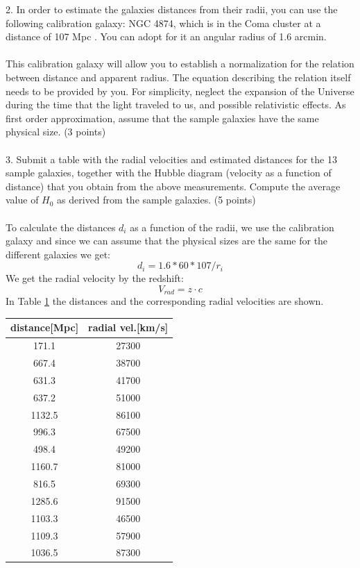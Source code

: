 \documentclass[11pt,a4paper,twoside]{article}
\begin{document}
2. In order to estimate the galaxies distances from their radii, you can use the following
calibration galaxy: NGC 4874, which is in the Coma cluster at a distance of 107 Mpc . You
can adopt for it an angular radius of 1.6 arcmin.\\
\\
This calibration galaxy will allow you to establish a normalization for the relation between
distance and apparent radius.
The equation describing the relation itself needs to be provided
by you. For simplicity, neglect the
expansion of the Universe during the time that the light
traveled to us, and possible relativistic effects. As first order approximation, assume that the
sample galaxies have the same physical size. (3 points)\\
\\
3. Submit a table with the radial velocities and estimated distances for the 13 sample
galaxies, together with the Hubble diagram (velocity as a function of distance) that you obtain
from the above measurements.
Compute the average value of $H_0$ as derived from the sample galaxies. (5 points)\\
\\
To calculate the distances $d_i$ as a function of the radii, we use the calibration galaxy and since we can assume that the physical sizes are the same for the different galaxies we get:
\begin{equation}
d_i=1.6*60*107/r_i
\end{equation}
We get the radial velocity by the redshift:
\begin{equation}
V_{rad}=z\cdot c
\end{equation}
In Table \ref{tab} the distances and the corresponding radial velocities are shown.
\begin{table}[h!]
	\centering
	\begin{tabular}{cc}
		
		distance[Mpc]& radial vel.[km/s]\\
		\toprule
		171.1 &27300\\
		667.4&38700\\
		631.3&41700\\
		637.2&51000\\
		1132.5&86100\\
		996.3&67500\\
		498.4&49200\\
		1160.7&81000\\
		816.5&69300\\
		1285.6&91500\\
		1103.3&46500\\
		1109.3&57900\\
		1036.5&87300\\
		
		
	\end{tabular}
	\label{tab}
\end{table}
\end{document}
